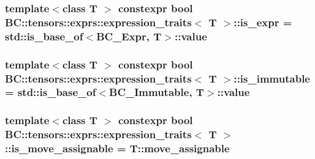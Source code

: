 \subsubsection[{\texorpdfstring{is\+\_\+expr}{is_expr}}]{\setlength{\rightskip}{0pt plus 5cm}template$<$class T $>$ constexpr bool {\bf B\+C\+::tensors\+::exprs\+::expression\+\_\+traits}$<$ T $>$\+::is\+\_\+expr = std\+::is\+\_\+base\+\_\+of$<${\bf B\+C\+\_\+\+Expr}, T$>$\+::value\hspace{0.3cm}{\ttfamily [static]}}\hypertarget{structBC_1_1tensors_1_1exprs_1_1expression__traits_a11b9ac090e8715f9376590a03c8f6afd}{}\label{structBC_1_1tensors_1_1exprs_1_1expression__traits_a11b9ac090e8715f9376590a03c8f6afd}
\subsubsection[{\texorpdfstring{is\+\_\+immutable}{is_immutable}}]{\setlength{\rightskip}{0pt plus 5cm}template$<$class T $>$ constexpr bool {\bf B\+C\+::tensors\+::exprs\+::expression\+\_\+traits}$<$ T $>$\+::is\+\_\+immutable = std\+::is\+\_\+base\+\_\+of$<${\bf B\+C\+\_\+\+Immutable}, T$>$\+::value\hspace{0.3cm}{\ttfamily [static]}}\hypertarget{structBC_1_1tensors_1_1exprs_1_1expression__traits_a555e0eff871b0495d9405a436d9a1f4d}{}\label{structBC_1_1tensors_1_1exprs_1_1expression__traits_a555e0eff871b0495d9405a436d9a1f4d}
\subsubsection[{\texorpdfstring{is\+\_\+move\+\_\+assignable}{is_move_assignable}}]{\setlength{\rightskip}{0pt plus 5cm}template$<$class T $>$ constexpr bool {\bf B\+C\+::tensors\+::exprs\+::expression\+\_\+traits}$<$ T $>$\+::is\+\_\+move\+\_\+assignable = T\+::move\+\_\+assignable\hspace{0.3cm}{\ttfamily [static]}}\hypertarget{structBC_1_1tensors_1_1exprs_1_1expression__traits_afc39357c204a3ab34923e6d7ee713698}{}\label{structBC_1_1tensors_1_1exprs_1_1expression__traits_afc39357c204a3ab34923e6d7ee713698}
